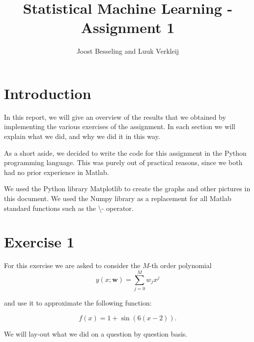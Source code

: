 \documentclass[11pt]{article}
\title{Statistical Machine Learning - Assignment 1}
\author{Joost Besseling and Luuk Verkleij}
\begin{document}
\lstset{language=Python}
\maketitle

\section{Introduction}
In this report, we will give an overview of the results that we obtained by implementing the various exercises of the assignment. In each section we will explain what we did, and why we did it in this way. 

As a short aside, we decided to write the code for this assignment in the Python programming language. This was purely out of practical reasons, since we both had no prior experience in Matlab. 

We used the Python library Matplotlib %
to create the graphs and other pictures in this document. We used the Numpy library as a replacement for all Matlab standard functions such as the \textbackslash - operator.

\section{Exercise 1}
For this exercise we are asked to consider the $M$-th order polynomial 
\[
y(x;\textbf{w}) = \sum^M_{j=0} w_j x^j
\]

and use it to approximate the following function:

\[
	f(x) = 1+ \sin(6(x-2)).
\]

We will lay-out what we did on a question by question basis. 

\end{document}
